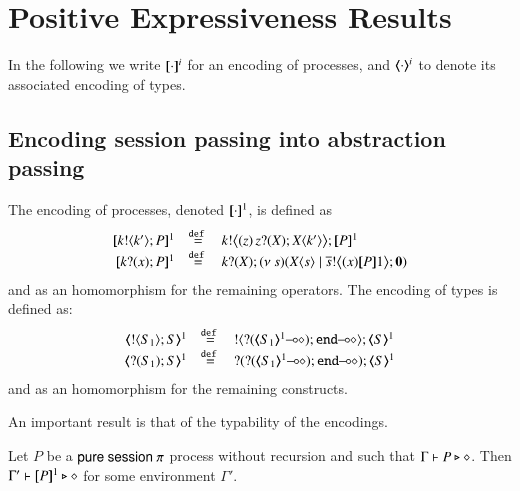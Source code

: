 
\section{Positive Expressiveness Results}
In the following we write $[\!\![\cdot]\!\!]^i$ for an encoding of processes, and $\langle\!\!\langle\cdot\rangle\!\!\rangle^i$ to denote its associated encoding of types.

\subsection{Encoding session passing into abstraction passing}

\begin{definition}
The encoding of processes, denoted $[\!\![\cdot]\!\!]^1$, is defined as 
\[
	\begin{array}{rcl}
		\pmap{\bout{k}{k'} P}{1}	&\defeq&	\bbout{k}{ \abs{z}{\,\binp{z}{X} \appl{X}{k'}} } \pmap{P}{1} \\
		\pmap{\binp{k}{x} P}{1}	&\defeq&	\binp{k}{X} \newsp{s}{\appl{X}{s} \Par \bbout{\dual{s}}{\abs{x} \map{P}{1}} \inact}
	\end{array}
\]
and as an homomorphism for the remaining operators. The encoding of types is defined as:
\[
	\begin{array}{rcl}
		\tmap{\btout{S_1} {S} }{1}	&\defeq&	\btout{\lhot{\btinp{\lhot{\tmap{S_1}{1}}}\tinact}} \tmap{S}{1}  \\
		\tmap{\btinp{S_1} S }{1}	&\defeq&	\btinp{\lhot{\btinp{\lhot{\tmap{S_1}{1}}}\tinact}} \tmap{S}{1} 
	\end{array}
\]
and as an homomorphism for the remaining constructs.
\end{definition}

An important result is that of the typability of the encodings.

\begin{proposition}
	Let $P$ be a $\mathsf{pure\ session\ }\pi$ process without recursion and such that $\Gamma \vdash P \triangleright \diamond$. 
	Then $\Gamma' \vdash [\!\![P]\!\!]^1 \triangleright \diamond$
	for some environment $\Gamma'$.
\end{proposition}

